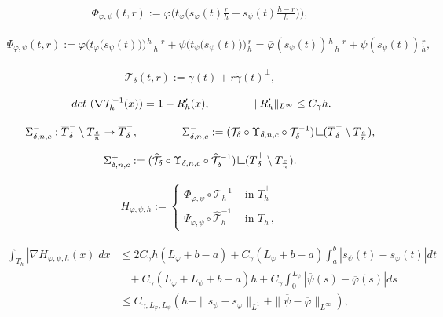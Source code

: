 \documentclass[10pt,a4paper]{amsart}
\def\det{\,{\rm det\ }}
\newcommand{\res}      {\mathop{\hbox{\vrule height 7pt width .5pt depth
                        0pt\vrule height .5pt width 6pt depth 0pt}}\nolimits}
\begin{document}
\begin{align}\label{Phi_interp}
\Phi_{\varphi,\psi}(t,r):=\varphi\Big(t_\varphi\big(s_\varphi(t)\frac{r}{h}+s_\psi(t)\frac{h-r}{h} \big)\Big),
\end{align}

\begin{align}\label{Psi_interp}
	\Psi_{\varphi,\psi}(t,r):=\varphi\Big(t_\varphi\big(s_\psi(t)\big)\Big)\frac{h-r}{h}+\psi\Big(t_\psi\big(s_\psi(t)\big)\Big)\frac{r}{h}=\overline \varphi(s_\psi(t))\frac{h-r}{h}+\overline \psi(s_\psi(t))\frac{r}{h},
\end{align}

\begin{align}\label{mathcalTdelta}
	\mathcal T_\delta(t,r):=\gamma(t)+r\dot\gamma(t)^\perp,
\end{align}

\begin{align}\det(\nabla \mathcal T_h^{-1}(x))= 1+R'_h(x),\qquad \qquad \|R'_h\|_{L^\infty}\leq C_\gamma h.\label{detT-1}
\end{align}

\begin{align}\label{Sigma-}
\Sigma_{\delta,n,c}^-:\overline T_\delta^-\setminus T_{\frac cn}\rightarrow \overline T^-_\delta,\qquad \qquad \Sigma^-_{\delta,n,c}:=(\mathcal T_\delta \circ \Upsilon_{\delta,n,c}\circ \mathcal T_\delta^{-1})\res (\overline T^-_\delta\setminus T_{\frac cn}),
\end{align}

\begin{align}\label{Sigma+}
\Sigma^+_{\delta,n,c}:=(\widehat {\mathcal T}_\delta \circ \Upsilon_{\delta,n,c}\circ \widehat{\mathcal T}_\delta^{-1})\res (\overline T_\delta^+\setminus  T_{\frac cn}).
\end{align} 

\begin{align}\label{Hinterp}
H_{\varphi,\psi,h}:=\begin{cases}
				 \Phi_{\varphi,\psi}\circ \mathcal T_h^{-1}&\text{ in }\overline T_h^+\\
			 \Psi_{\varphi,\psi}\circ \widehat {\mathcal T}_h^{-1}&\text{ in }\overline T_h^-,
					\end{cases}
\end{align}

\begin{align}\label{est:nablaH}
	\int_{T_h}|\nabla H_{\varphi,\psi,h}(x)|dx&\leq 2C_\gamma h(L_\varphi+b-a)+C_\gamma (L_\varphi+b-a)\int_a^b|s_\psi(t)-s_\varphi(t)|dt\nonumber\\&\;\;\;+C_\gamma(L_\varphi+L_\psi+b-a)h+C_\gamma\int_0^{L_\psi}|{\overline \psi}(s)-{\overline \varphi}(s)|ds\nonumber\\
	&\leq C_{\gamma,L_\varphi,L_\psi}(h+\|s_\psi-s_\varphi\|_{L^1}+\|{\overline \psi}-{\overline \varphi}\|_{L^\infty}),
\end{align}
\end{document}
